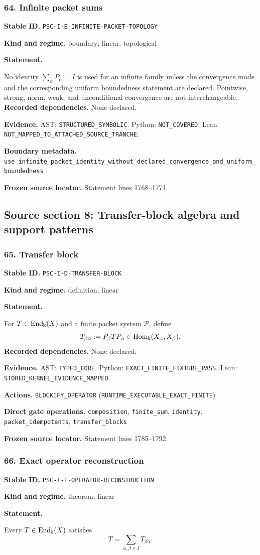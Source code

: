 \documentclass[a4paper,11pt]{article}
\newcommand{\bbk}{\Bbbk}\newcommand{\A}{\mathcal A}\newcommand{\B}{\mathcal B}\newcommand{\Ccal}{\mathcal C}\newcommand{\Pcal}{\mathcal P}\newcommand{\Qcal}{\mathcal Q}\newcommand{\Rcal}{\mathcal R}\newcommand{\Scal}{\mathcal S}
\newcommand{\field}[2]{\noindent\textbf{#1.} #2\par}
\begin{document}
\subsubsection*{64. Infinite packet sums}
\label{rec:PSC-I-B-INFINITE-PACKET-TOPOLOGY}
\field{Stable ID}{\nolinkurl{PSC-I-B-INFINITE-PACKET-TOPOLOGY}}
\field{Kind and regime}{boundary; linear, topological}
\textbf{Statement.}\par
No identity $\sum_\alpha P_\alpha=I$ is used for an infinite family unless the convergence mode and the corresponding uniform boundedness statement are declared.  Pointwise, strong, norm, weak, and unconditional convergence are not interchangeable.
\field{Recorded dependencies}{None declared.}
\field{Evidence}{AST: \nolinkurl{STRUCTURED_SYMBOLIC}. Python: \nolinkurl{NOT_COVERED}. Lean: \nolinkurl{NOT_MAPPED_TO_ATTACHED_SOURCE_TRANCHE}.}
\field{Boundary metadata}{\nolinkurl{use_infinite_packet_identity_without_declared_convergence_and_uniform_boundedness}}
\field{Frozen source locator}{Statement lines 1768--1771.}
\clearpage\subsection{Source section 8: Transfer-block algebra and support patterns}
\subsubsection*{65. Transfer block}
\label{rec:PSC-I-D-TRANSFER-BLOCK}
\field{Stable ID}{\nolinkurl{PSC-I-D-TRANSFER-BLOCK}}
\field{Kind and regime}{definition; linear}
\textbf{Statement.}\par
For $T\in\End_{\bbk}(X)$ and a finite packet system $\Pcal$, define
\[
T_{\beta\alpha}:=P_\beta TP_\alpha
\in\Hom_{\bbk}(X_\alpha,X_\beta).
\]
\field{Recorded dependencies}{None declared.}
\field{Evidence}{AST: \nolinkurl{TYPED_CORE}. Python: \nolinkurl{EXACT_FINITE_FIXTURE_PASS}. Lean: \nolinkurl{STORED_KERNEL_EVIDENCE_MAPPED}.}
\field{Actions}{\nolinkurl{BLOCKIFY_OPERATOR} (\nolinkurl{RUNTIME_EXECUTABLE_EXACT_FINITE})}
\field{Direct gate operations}{\nolinkurl{composition}, \nolinkurl{finite_sum}, \nolinkurl{identity}, \nolinkurl{packet_idempotents}, \nolinkurl{transfer_blocks}}
\field{Frozen source locator}{Statement lines 1785--1792.}
\subsubsection*{66. Exact operator reconstruction}
\label{rec:PSC-I-T-OPERATOR-RECONSTRUCTION}
\field{Stable ID}{\nolinkurl{PSC-I-T-OPERATOR-RECONSTRUCTION}}
\field{Kind and regime}{theorem; linear}
\textbf{Statement.}\par
Every $T\in\End_{\bbk}(X)$ satisfies
\[
\boxed{T=\sum_{\alpha,\beta\in I}T_{\beta\alpha}.}
\]
\end{document}
